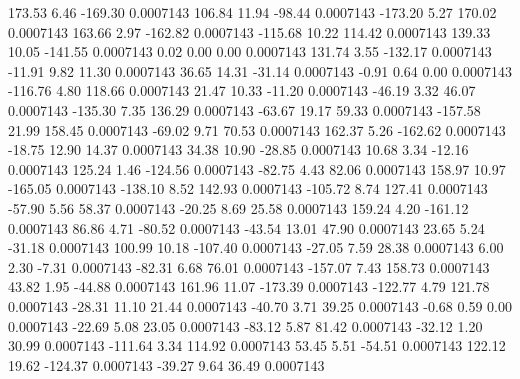       173.53        6.46     -169.30     0.0007143
      106.84       11.94      -98.44     0.0007143
     -173.20        5.27      170.02     0.0007143
      163.66        2.97     -162.82     0.0007143
     -115.68       10.22      114.42     0.0007143
      139.33       10.05     -141.55     0.0007143
        0.02        0.00        0.00     0.0007143
      131.74        3.55     -132.17     0.0007143
      -11.91        9.82       11.30     0.0007143
       36.65       14.31      -31.14     0.0007143
       -0.91        0.64        0.00     0.0007143
     -116.76        4.80      118.66     0.0007143
       21.47       10.33      -11.20     0.0007143
      -46.19        3.32       46.07     0.0007143
     -135.30        7.35      136.29     0.0007143
      -63.67       19.17       59.33     0.0007143
     -157.58       21.99      158.45     0.0007143
      -69.02        9.71       70.53     0.0007143
      162.37        5.26     -162.62     0.0007143
      -18.75       12.90       14.37     0.0007143
       34.38       10.90      -28.85     0.0007143
       10.68        3.34      -12.16     0.0007143
      125.24        1.46     -124.56     0.0007143
      -82.75        4.43       82.06     0.0007143
      158.97       10.97     -165.05     0.0007143
     -138.10        8.52      142.93     0.0007143
     -105.72        8.74      127.41     0.0007143
      -57.90        5.56       58.37     0.0007143
      -20.25        8.69       25.58     0.0007143
      159.24        4.20     -161.12     0.0007143
       86.86        4.71      -80.52     0.0007143
      -43.54       13.01       47.90     0.0007143
       23.65        5.24      -31.18     0.0007143
      100.99       10.18     -107.40     0.0007143
      -27.05        7.59       28.38     0.0007143
        6.00        2.30       -7.31     0.0007143
      -82.31        6.68       76.01     0.0007143
     -157.07        7.43      158.73     0.0007143
       43.82        1.95      -44.88     0.0007143
      161.96       11.07     -173.39     0.0007143
     -122.77        4.79      121.78     0.0007143
      -28.31       11.10       21.44     0.0007143
      -40.70        3.71       39.25     0.0007143
       -0.68        0.59        0.00     0.0007143
      -22.69        5.08       23.05     0.0007143
      -83.12        5.87       81.42     0.0007143
      -32.12        1.20       30.99     0.0007143
     -111.64        3.34      114.92     0.0007143
       53.45        5.51      -54.51     0.0007143
      122.12       19.62     -124.37     0.0007143
      -39.27        9.64       36.49     0.0007143
